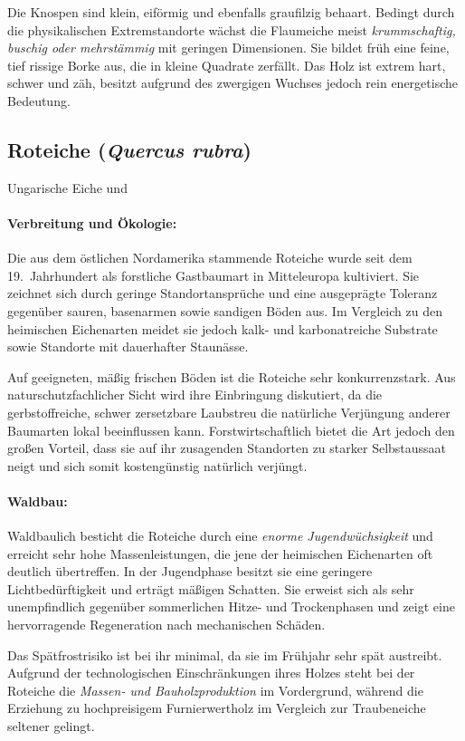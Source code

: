 \documentclass[twocolumn, bibliography=totoc, abstract=true]{scrartcl}
\begin{document}
Die Knospen sind klein, eiförmig und ebenfalls graufilzig behaart. Bedingt durch die physikalischen Extremstandorte wächst die Flaumeiche meist \emph{krummschaftig, buschig oder mehrstämmig} mit geringen Dimensionen. Sie bildet früh eine feine, tief rissige Borke aus, die in kleine Quadrate zerfällt. Das Holz ist extrem hart, schwer und zäh, besitzt aufgrund des zwergigen Wuchses jedoch rein energetische Bedeutung.

\subsection{Roteiche (\textit{Quercus rubra})}
Ungarische Eiche und
\paragraph{Verbreitung und Ökologie:}
Die aus dem östlichen Nordamerika stammende Roteiche wurde seit dem 19.~Jahrhundert als forstliche Gastbaumart in Mitteleuropa kultiviert. Sie zeichnet sich durch geringe Standortansprüche und eine ausgeprägte Toleranz gegenüber sauren, basenarmen sowie sandigen Böden aus. Im Vergleich zu den heimischen Eichenarten meidet sie jedoch kalk- und karbonatreiche Substrate sowie Standorte mit dauerhafter Staunässe. 

Auf geeigneten, mäßig frischen Böden ist die Roteiche sehr konkurrenzstark. Aus naturschutzfachlicher Sicht wird ihre Einbringung diskutiert, da die gerbstoffreiche, schwer zersetzbare Laubstreu die natürliche Verjüngung anderer Baumarten lokal beeinflussen kann. Forstwirtschaftlich bietet die Art jedoch den großen Vorteil, dass sie auf ihr zusagenden Standorten zu starker Selbstaussaat neigt und sich somit kostengünstig  natürlich verjüngt.

\paragraph{Waldbau:}
Waldbaulich besticht die Roteiche durch eine \emph{enorme Jugendwüchsigkeit} und erreicht sehr hohe Massenleistungen, die jene der heimischen Eichenarten oft deutlich übertreffen. In der Jugendphase besitzt sie eine geringere Lichtbedürftigkeit und erträgt mäßigen Schatten. Sie erweist sich als sehr unempfindlich gegenüber sommerlichen Hitze- und Trockenphasen und zeigt eine hervorragende Regeneration nach mechanischen Schäden. 

Das Spätfrostrisiko ist bei ihr minimal, da sie im Frühjahr sehr spät austreibt. Aufgrund der technologischen Einschränkungen ihres Holzes steht bei der Roteiche die \emph{Massen- und Bauholzproduktion} im Vordergrund, während die Erziehung zu hochpreisigem Furnierwertholz im Vergleich zur Traubeneiche seltener gelingt.
\end{document}
